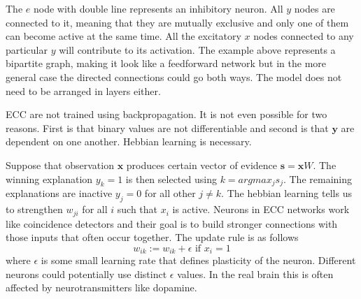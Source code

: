 \documentclass[12pt]{article}
\begin{document}
The  $e$ node with double line represents an inhibitory neuron. All $y$ nodes are connected to it, meaning that they are mutually exclusive and only one of them can become active at the same time. All the excitatory $x$ nodes connected to any particular $y$ will contribute to its activation. The example above represents a bipartite graph, making it look like a feedforward network but in the more general case the directed connections could go both ways. The model does not need to be arranged in layers either.  

ECC are not trained using backpropagation. It is not even possible for two reasons. First is that binary values are not differentiable and second is that $\boldsymbol{y}$ are dependent on one another. Hebbian learning is necessary. 

Suppose that observation $\boldsymbol{x}$ produces certain vector of evidence $\boldsymbol{s}=\boldsymbol{x}W$. The winning explanation $y_k=1$ is then selected using $k=argmax_j s_j$. The remaining explanations are inactive $y_j=0$ for all other $j\ne k$.
The hebbian learning tells us to strengthen $w_{ji}$ for all $i$ such that $x_i$ is active. Neurons in ECC networks work like coincidence detectors and their goal is to build stronger connections with those inputs that often occur together. The update rule is as follows
\[
w_{ik} := w_{ik} + \epsilon \text{ if } x_i=1
\]
where $\epsilon$ is some small learning rate that defines plasticity of the neuron. Different neurons could potentially use distinct $\epsilon$ values. In the real brain this is often affected by neurotransmitters like dopamine. 
\end{document}
